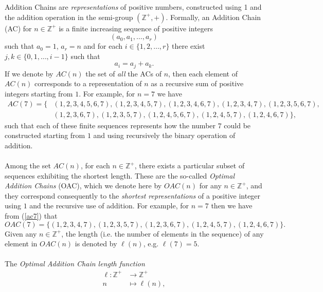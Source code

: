 \documentclass[letterpaper,12pt]{article}
\theoremstyle{definition}
\begin{document}
Addition Chains are \textit{representations} of positive numbers, constructed using 1 and the addition operation in the semi-group $(\mathbb{Z}^+,+)$. Formally, an Addition Chain (AC) for $n \in \mathbb{Z}^+$ is a finite increasing sequence of positive integers 
\begin{equation*}
    (a_0,a_1,\dots,a_r)
\end{equation*}
such that $a_0=1$, $a_r=n$ and for each $i \in \{1,2,\dots,r\}$ there exist $j,k \in \{0,1,\dots,i-1\}$ such that
\begin{equation}\label{adi}
    a_i=a_j+a_k.
\end{equation}
If we denote by $AC(n)$ the set of \textit{all}
the ACs of $n$, then each element of $AC(n)$ corresponds to a representation of $n$ as a recursive sum of positive integers starting from $1$. For example, for $n=7$ we have 
\begin{equation}\label{ac7}
\begin{split}
    AC(7)=\{ & (1,2,3,4,5,6,7),(1,2,3,4,5,7),(1,2,3,4,6,7),(1,2,3,4,7), (1,2,3,5,6,7), \\
    &(1,2,3,6,7), (1,2,3,5,7), (1,2,4,5,6,7),(1,2,4,5,7),(1,2,4,6,7)\},
\end{split}
\end{equation}
such that each of these finite sequences represents how the number $7$ could be constructed starting from $1$ and using recursively the binary operation of addition. \\\\
Among the set $AC(n)$, for each $n \in \mathbb{Z}^+$, there exists a particular subset of sequences exhibiting the shortest length. These are the so-called \textit{Optimal Addition Chains} (OAC), which we denote here by $OAC(n)$ for any $n \in \mathbb{Z}^+$, and they correspond consequently to the \textit{shortest representations} of a positive integer using $1$ and the recursive use of addition. For example, for $n=7$ then we have from (\ref{ac7}) that
\begin{equation}
  OAC(7)=\{(1,2,3,4,7),(1,2,3,5,7),(1,2,3,6,7),(1,2,4,5,7),(1,2,4,6,7)\}.  
\end{equation}
Given any $n \in \mathbb{Z}^{+}$, the length (i.e. the number of elements in the sequence) of any element in $OAC(n)$ is denoted by $\ell(n)$, e.g. $\ell(7)=5$.\\\\ 
The \textit{Optimal Addition Chain length function} 
\begin{equation}
\begin{split}
    \ell: \mathbb{Z}^+ & \to \mathbb{Z}^+ \\
    n & \mapsto \ell(n),
    \end{split}
\end{equation} 
\end{document}
